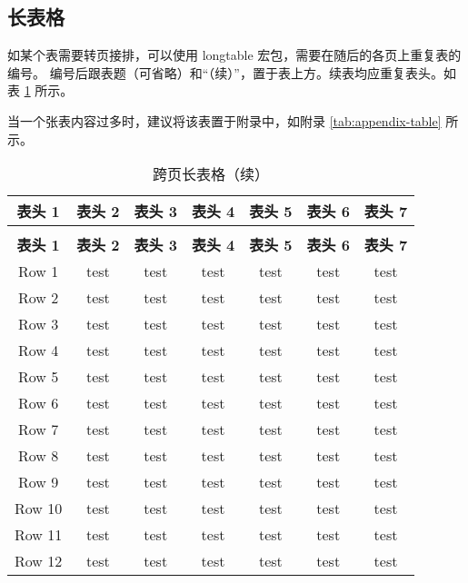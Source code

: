 \documentclass[report, twoside, UTF8, AutoFakeBold = 1, AutoFakeSlant, zihao = -4]{config}
\begin{document}
\subsection{长表格}

如某个表需要转页接排，可以使用 longtable 宏包，需要在随后的各页上重复表的编号。
编号后跟表题（可省略）和“（续）”，置于表上方。续表均应重复表头。如表 \ref{tab:longTable} 所示。

当一个张表内容过多时，建议将该表置于附录中，如附录 \ref{tab:appendix-table} 所示。

\begin{longtable}{ccccccc}
    \caption{跨页长表格} \\ %
    \toprule[1.5pt]
        \textbf{表头 1} & \textbf{表头 2} & \textbf{表头 3} & \textbf{表头 4} & \textbf{表头 5} & \textbf{表头 6} & \textbf{表头 7} \\ %
    \midrule[0.8pt]
    \endfirsthead
    
    \caption[]{跨页长表格（续）} \\ %
    \toprule[1.5pt]
        \textbf{表头 1} & \textbf{表头 2} & \textbf{表头 3} & \textbf{表头 4} & \textbf{表头 5} & \textbf{表头 6} & \textbf{表头 7} \\  %
    \midrule[0.8pt]
    \endhead
        \bottomrule[1.5pt]
    \endfoot 
    \bottomrule[1.5pt]
    \endlastfoot
    \label{tab:longTable}
        Row 1  & test & test & test & test & test & test \\
        Row 2  & test & test & test & test & test & test \\
        Row 3  & test & test & test & test & test & test \\
        Row 4  & test & test & test & test & test & test \\
        Row 5  & test & test & test & test & test & test \\
        Row 6  & test & test & test & test & test & test \\
        Row 7  & test & test & test & test & test & test \\
        Row 8  & test & test & test & test & test & test \\
        Row 9  & test & test & test & test & test & test \\
        Row 10  & test & test & test & test & test & test \\
        Row 11  & test & test & test & test & test & test \\
        Row 12  & test & test & test & test & test & test \\
\end{longtable}
\end{document}
